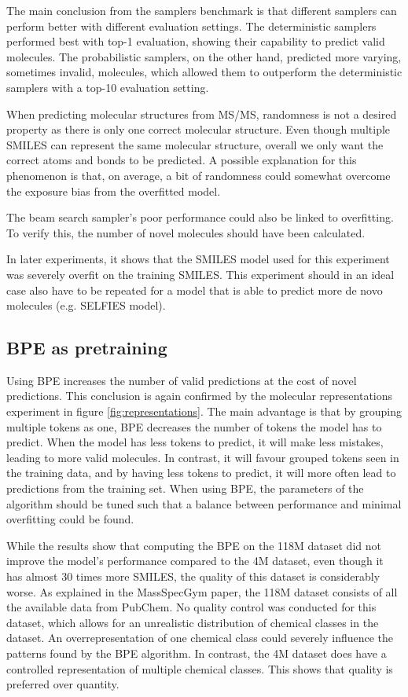 The main conclusion from the samplers benchmark is that different samplers can perform better with different evaluation settings.
The deterministic samplers performed best with top-1 evaluation, showing their capability to predict valid molecules.
The probabilistic samplers, on the other hand, predicted more varying, sometimes invalid, molecules, which allowed them to outperform the deterministic samplers with a top-10 evaluation setting.

When predicting molecular structures from \ac{MS/MS}, randomness is not a desired property as there is only one correct molecular structure.
Even though multiple SMILES can represent the same molecular structure, overall we only want the correct atoms and bonds to be predicted.
A possible explanation for this phenomenon is that, on average, a bit of randomness could somewhat overcome the exposure bias from the overfitted model.

The beam search sampler's poor performance could also be linked to overfitting.
To verify this, the number of novel molecules should have been calculated.

In later experiments, it shows that the SMILES model used for this experiment was severely overfit on the training SMILES.
This experiment should in an ideal case also have to be repeated for a model that is able to predict more de novo molecules (e.g. SELFIES model).

\subsection{\ac{BPE} as pretraining}

Using \ac{BPE} increases the number of valid predictions at the cost of novel predictions. 
This conclusion is again confirmed by the molecular representations experiment in figure \ref{fig:representations}.
The main advantage is that by grouping multiple tokens as one, \ac{BPE} decreases the number of tokens the model has to predict.
When the model has less tokens to predict, it will make less mistakes, leading to more valid molecules.
In contrast, it will favour grouped tokens seen in the training data, and by having less tokens to predict, it will more often lead to predictions from the training set.
When using \ac{BPE}, the parameters of the algorithm should be tuned such that a balance between performance and minimal overfitting could be found.

While the results show that computing the \ac{BPE} on the 118M dataset did not improve the model's performance compared to the 4M dataset, even though it has almost 30 times more SMILES,
the quality of this dataset is considerably worse.
As explained in the MassSpecGym paper, the 118M dataset consists of all the available data from PubChem. 
No quality control was conducted for this dataset, which allows for an unrealistic distribution of chemical classes in the dataset.
An overrepresentation of one chemical class could severely influence the patterns found by the \ac{BPE} algorithm.
In contrast, the 4M dataset does have a controlled representation of multiple chemical classes.
This shows that quality is preferred over quantity.

